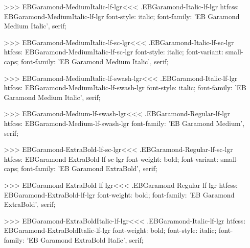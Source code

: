 >>>
\<EBGaramond-MediumItalic-lf-lgr\><<<
.EBGaramond-Italic-lf-lgr
htfcss:  EBGaramond-MediumItalic-lf-lgr  font-style: italic; font-family: 'EB Garamond Medium Italic', serif;

>>>
\<EBGaramond-MediumItalic-lf-sc-lgr\><<<
.EBGaramond-Italic-lf-sc-lgr
htfcss:  EBGaramond-MediumItalic-lf-sc-lgr  font-style: italic; font-variant: small-caps; font-family: 'EB Garamond Medium Italic', serif;

>>>
\<EBGaramond-MediumItalic-lf-swash-lgr\><<<
.EBGaramond-Italic-lf-lgr
htfcss:  EBGaramond-MediumItalic-lf-swash-lgr  font-style: italic; font-family: 'EB Garamond Medium Italic', serif;

>>>
\<EBGaramond-Medium-lf-swash-lgr\><<<
.EBGaramond-Regular-lf-lgr
htfcss:  EBGaramond-Medium-lf-swash-lgr  font-family: 'EB Garamond Medium', serif;

>>>
\<EBGaramond-ExtraBold-lf-sc-lgr\><<<
.EBGaramond-Regular-lf-sc-lgr
htfcss:  EBGaramond-ExtraBold-lf-sc-lgr  font-weight: bold; font-variant: small-caps; font-family: 'EB Garamond ExtraBold', serif;

>>>
\<EBGaramond-ExtraBold-lf-lgr\><<<
.EBGaramond-Regular-lf-lgr
htfcss:  EBGaramond-ExtraBold-lf-lgr  font-weight: bold; font-family: 'EB Garamond ExtraBold', serif;

>>>
\<EBGaramond-ExtraBoldItalic-lf-lgr\><<<
.EBGaramond-Italic-lf-lgr
htfcss:  EBGaramond-ExtraBoldItalic-lf-lgr  font-weight: bold; font-style: italic; font-family: 'EB Garamond ExtraBold Italic', serif;

